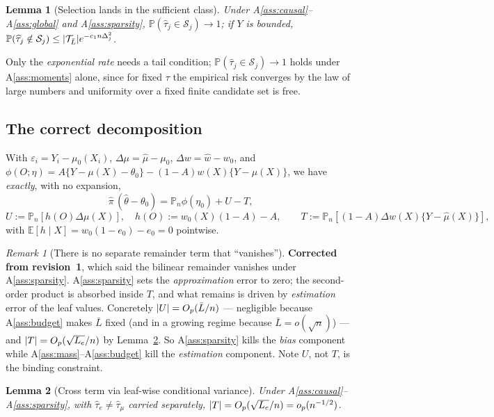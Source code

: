 \documentclass[11pt]{article}
\theoremstyle{plain}
\newtheorem{lemma}{Lemma}
\theoremstyle{definition}
\theoremstyle{remark}
\newtheorem{remark}{Remark}
\newcommand{\E}{\mathbb{E}}
\newcommand{\PP}{\mathbb{P}}
\newcommand{\Pn}{\mathbb{P}_n}
\newcommand{\cT}{\mathcal{T}}
\newcommand{\cS}{\mathcal{S}}
\newcommand{\ez}{e_0}
\newcommand{\mz}{\mu_0}
\newcommand{\wz}{w_0}
\newcommand{\mhat}{\widehat{\mu}}
\newcommand{\what}{\widehat{w}}
\newcommand{\that}{\widehat{\tau}}
\newcommand{\thetahat}{\widehat{\theta}}
\newcommand{\pihat}{\widehat{\pi}}
\DeclarePairedDelimiter{\abs}{\lvert}{\rvert}
\DeclarePairedDelimiter{\card}{\lvert}{\rvert}
\begin{document}
\begin{lemma}[Selection lands in the sufficient class]\label{lem:selection}
Under A\ref{ass:causal}--A\ref{ass:global} and A\ref{ass:sparsity},
$\PP(\that_j\in\cS_j)\to1$; if $Y$ is bounded,
$\PP(\that_j\notin\cS_j)\le\card{\cT_{\bar L}}e^{-c_1n\Delta_j^2}$.
\end{lemma}

\noindent Only the \emph{exponential rate} needs a tail condition;
$\PP(\that_j\in\cS_j)\to1$ holds under A\ref{ass:moments} alone, since for fixed
$\tau$ the empirical risk converges by the law of large numbers and uniformity
over a fixed finite candidate set is free.

\subsection{The correct decomposition}

With $\varepsilon_i=Y_i-\mz(X_i)$, $\Delta\mu=\mhat-\mz$, $\Delta w=\what-\wz$,
and $\phi(O;\eta)=A\{Y-\mu(X)-\theta_0\}-(1-A)w(X)\{Y-\mu(X)\}$, we have
\emph{exactly}, with no expansion,
\begin{equation}\label{eq:skeleton}
  \pihat\,(\thetahat-\theta_0)=\Pn\phi(\eta_0)+U-T,
\end{equation}
\[
 U:=\Pn[h(O)\Delta\mu(X)],\quad h(O):=\wz(X)(1-A)-A,\qquad
 T:=\Pn[(1-A)\Delta w(X)\{Y-\mhat(X)\}],
\]
with $\E[h\mid X]=\wz(1-\ez)-\ez=0$ pointwise.

\begin{remark}[There is no separate remainder term that ``vanishes'']
\label{rem:no-vanish}
\textbf{Corrected from revision~1}, which said the bilinear remainder vanishes
under A\ref{ass:sparsity}. A\ref{ass:sparsity} sets the \emph{approximation} error
to zero; the second-order product is absorbed inside $T$, and what remains is
driven by \emph{estimation} error of the leaf values. Concretely
$\abs U=O_p(\bar L/n)$ --- negligible because A\ref{ass:budget} makes $\bar L$
fixed (and in a growing regime because $\bar L=o(\sqrt n)$) --- and
$\abs T=O_p(\sqrt{L_e}/n)$ by Lemma~\ref{lem:cross}. So A\ref{ass:sparsity} kills
the \emph{bias} component while A\ref{ass:mass}--A\ref{ass:budget} kill the
\emph{estimation} component. Note $U$, not $T$, is the binding constraint.
\end{remark}

\begin{lemma}[Cross term via leaf-wise conditional variance]\label{lem:cross}
Under A\ref{ass:causal}--A\ref{ass:sparsity}, with $\that_e\ne\that_\mu$ carried
separately, $\abs T=O_p(\sqrt{L_e}/n)=o_p(n^{-1/2})$.
\end{lemma}
\end{document}
